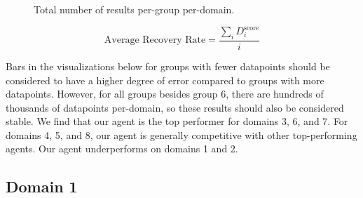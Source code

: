 \documentclass[titlepage]{article}
\begin{document}
\begin{figure}[ht]
    \caption{Total number of results per-group per-domain.}
    \label{fig:totals}
\end{figure}


\begin{equation*}
    \text{Average Recovery Rate} = \frac{\sum_i D^\text{score}_i}{i}
\end{equation*}

Bars in the visualizations below for groups with fewer datapoints should be considered to have a higher degree of error compared to groups with more datapoints. However, for all groups besides group 6, there are hundreds of thousands of datapoints per-domain, so these results should also be considered stable. We find that our agent is the top performer for domains 3, 6, and 7. For domains 4, 5, and 8, our agent is generally competitive with other top-performing agents. Our agent underperforms on domains 1 and 2.

\FloatBarrier

\subsection{Domain 1}
\end{document}
